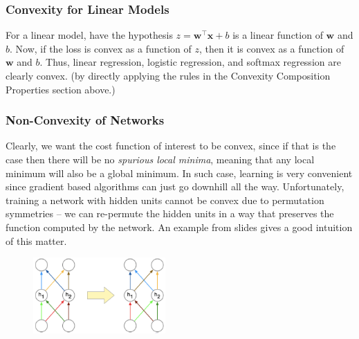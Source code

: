 \documentclass[11pt]{article}
\newcommand{\bw}{\mathbf{w}}
\newcommand{\bx}{\mathbf{x}}
\begin{document}
\subsubsection{Convexity for Linear Models}
For a linear model, have the hypothesis $z = \bw^\top \bx + b$ is a linear function of $\bw$ and $b$. Now, if the loss is convex as a function of $z$, then it is convex as a function of $\bw$ and $b$. Thus, linear regression, logistic regression, and softmax regression are clearly convex. (by directly applying the rules in the Convexity Composition Properties section above.)

\subsubsection{Non-Convexity of Networks}
Clearly, we want the cost function of interest to be convex, since if that is the case then there will be no \textit{spurious local minima}, meaning that any local minimum will also be a global minimum. In such case, learning is very convenient since gradient based algorithms can just go downhill all the way. Unfortunately, training a network with hidden units cannot be convex due to permutation symmetries -- we can re-permute the hidden units in a way that preserves the function computed by the network. An example from slides\cite{week4} gives a good intuition of this matter. 
\begin{figure}[H]
    \center \includegraphics[width=0.45\textwidth]{img/net_permutation}
\end{figure}
\end{document}
